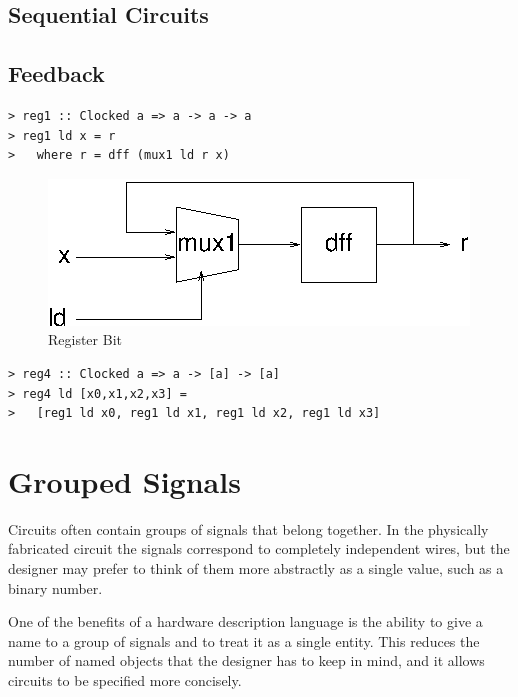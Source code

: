 \documentclass[a4paper,openany,fleqn]{book}
\begin{document}
\subsection{Sequential Circuits}
\label{sec:sequential-circuits-1}

\subsection{Feedback}
\label{sec:feedback}

\begin{verbatim}
> reg1 :: Clocked a => a -> a -> a
> reg1 ld x = r
>   where r = dff (mux1 ld r x)
\end{verbatim}

\begin{figure}[htbp]
  \begin{center}
    \includegraphics{../figures/xfig/reg1.eps}
    \caption{Register Bit}
    \label{fig:reg1}
  \end{center}
\end{figure}

\begin{verbatim}
> reg4 :: Clocked a => a -> [a] -> [a]
> reg4 ld [x0,x1,x2,x3] =
>   [reg1 ld x0, reg1 ld x1, reg1 ld x2, reg1 ld x3]
\end{verbatim}

\section{Grouped Signals}
\label{sec:grouped-signals}

Circuits often contain groups of signals that belong together.  In the
physically fabricated circuit the signals correspond to completely
independent wires, but the designer may prefer to think of them more
abstractly as a single value, such as a binary number.

One of the benefits of a hardware description language is the ability
to give a name to a group of signals and to treat it as a single
entity.  This reduces the number of named objects that the designer
has to keep in mind, and it allows circuits to be specified more
concisely.
\end{document}
